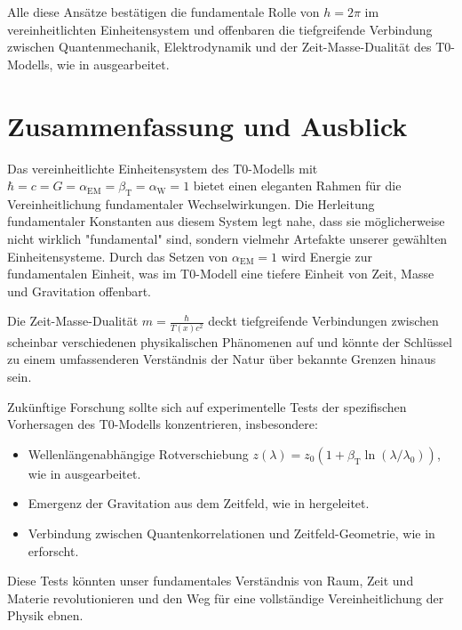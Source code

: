 \documentclass[12pt,a4paper]{article}
\newcommand{\Tfield}{T(x)}
\newcommand{\alphaEM}{\alpha_{\text{EM}}}
\newcommand{\alphaW}{\alpha_{\text{W}}}
\newcommand{\betaT}{\beta_{\text{T}}}
\begin{document}
	Alle diese Ansätze bestätigen die fundamentale Rolle von \(h = 2\pi\) im vereinheitlichten Einheitensystem und offenbaren die tiefgreifende Verbindung zwischen Quantenmechanik, Elektrodynamik und der Zeit-Masse-Dualität des T0-Modells, wie in \cite{pascher_zeit_2025} ausgearbeitet.
	
	\section{Zusammenfassung und Ausblick}
	\label{sec:summary}
	
	Das vereinheitlichte Einheitensystem des T0-Modells mit \(\hbar = c = G = \alphaEM = \betaT = \alphaW = 1\) bietet einen eleganten Rahmen für die Vereinheitlichung fundamentaler Wechselwirkungen. Die Herleitung fundamentaler Konstanten aus diesem System legt nahe, dass sie möglicherweise nicht wirklich "fundamental" sind, sondern vielmehr Artefakte unserer gewählten Einheitensysteme. Durch das Setzen von \(\alphaEM = 1\) wird Energie zur fundamentalen Einheit, was im T0-Modell eine tiefere Einheit von Zeit, Masse und Gravitation offenbart.
	
	Die Zeit-Masse-Dualität \(m = \frac{\hbar}{\Tfield c^2}\) deckt tiefgreifende Verbindungen zwischen scheinbar verschiedenen physikalischen Phänomenen auf und könnte der Schlüssel zu einem umfassenderen Verständnis der Natur über bekannte Grenzen hinaus sein.
	
	Zukünftige Forschung sollte sich auf experimentelle Tests der spezifischen Vorhersagen des T0-Modells konzentrieren, insbesondere:
	
	\begin{itemize}
		\item Wellenlängenabhängige Rotverschiebung \(z(\lambda) = z_0 (1 + \betaT \ln(\lambda/\lambda_0))\), wie in \cite{pascher_messdifferenzen_2025} ausgearbeitet.
		\item Emergenz der Gravitation aus dem Zeitfeld, wie in \cite{pascher_emergente_gravitation_2025} hergeleitet.
		\item Verbindung zwischen Quantenkorrelationen und Zeitfeld-Geometrie, wie in \cite{pascher_feldtheorie_2025} erforscht.
	\end{itemize}
	
	Diese Tests könnten unser fundamentales Verständnis von Raum, Zeit und Materie revolutionieren und den Weg für eine vollständige Vereinheitlichung der Physik ebnen.
	
\end{document}
